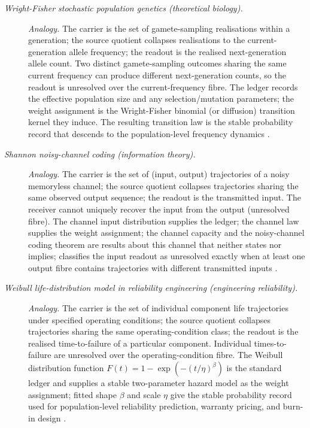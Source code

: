 \begin{description}
\item[\emph{Wright-Fisher stochastic population genetics
(theoretical biology).}] \textit{Analogy.}
The carrier is the set of gamete-sampling realisations
within a generation; the source quotient collapses
realisations to the current-generation allele frequency;
the readout is the realised next-generation allele
count.  Two distinct gamete-sampling outcomes sharing
the same current frequency can produce different
next-generation counts, so the readout is unresolved
over the current-frequency fibre.  The ledger records
the effective population size and any
selection/mutation parameters; the weight assignment is
the Wright-Fisher binomial (or diffusion) transition
kernel they induce.  The resulting transition law is
the stable probability record that descends to the
population-level frequency dynamics
\citep{Wright1931Evolution}.

\item[\emph{Shannon noisy-channel coding (information
theory).}] \textit{Analogy.}
The carrier is the set of (input, output) trajectories
of a noisy memoryless channel; the source quotient
collapses trajectories sharing the same observed output
sequence; the readout is the transmitted input.  The
receiver cannot uniquely recover the input from the
output (unresolved fibre).  The channel input
distribution supplies the ledger; the channel law
supplies the weight assignment; the channel capacity and the noisy-channel coding
theorem are results about this channel that 
neither states nor implies;  classifies the input readout as unresolved exactly
when at least one output fibre contains trajectories with
different transmitted inputs
\citep{Shannon1948Mathematical}.

\item[\emph{Weibull life-distribution model in
reliability engineering (engineering reliability).}] \textit{Analogy.}
The carrier is the set of individual component
life trajectories under specified operating conditions;
the source quotient collapses trajectories sharing the
same operating-condition class; the readout is the
realised time-to-failure of a particular component.
Individual times-to-failure are unresolved over the
operating-condition fibre.  The Weibull distribution
function \(F(t)=1-\exp(-(t/\eta)^{\beta})\) is the
standard ledger and supplies a stable two-parameter
hazard model as the weight assignment; fitted shape
\(\beta\) and scale \(\eta\) give the stable
probability record used for population-level
reliability prediction, warranty pricing, and burn-in
design \citep{Weibull1951Statistical}.
\end{description}
\endgroup

